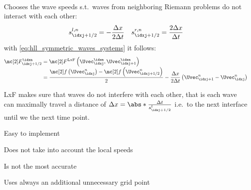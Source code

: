 \begin{defnbox}\nospacing
    \begin{defn}\label{defn:lax_friedrichs_scheme_non_linear_systems}\leavevmode\\
        Chooses the wave speeds s.t.\ waves from neighboring Riemann problems do not interact with each other:
        \begin{align}
          s_{\idxj+1/2}^{l,n}=-\frac{\Delta x}{2\Delta t}&&s_{\idxj+1/2}^{r,n}=\frac{2\Delta x}{\Delta t}
        \end{align}
        with \cref{eq:hll_symmetric_waves_systems} it follows:
        \begin{align}
          \Flux_{\idxj+1/2}^{\idxn}&=\Flux^{\text{LxF}}\left(\Uvec^{\idxn}_{\idxj},\Uvec^{\idxn}_{\idxj+1}\right)\\[-1\jot]
          &=\frac{\flux\left(\Uvec_{\idxj}^{n}\right)-\flux \left(\Uvec_{\idxj+1/2}^{n}\right)}{2}-\frac{\Delta x}{2\Delta t}\left(\Uvec_{\idxj+1}^{n}-\Uvec_{\idxj}^{n}\right)\nonumber
        \end{align}
    \end{defn}
\end{defnbox}
\begin{explanationbox}\nospacing
    \begin{explanation}
        LxF makes sure that waves do not interfere with each other, that is each wave can maximally travel a distance of $\Delta x=\abs*{\frac{\Delta t}{s_{\idxj+1/2}^{l}}}$ i.e.\ to the next interface until we the next time point.
    \end{explanation}
\end{explanationbox}
\begin{sectionbox}\nospacing
    \begin{minipage}[t]{0.4\textwidth}
       \begin{proslist}
           \item Easy to implement
       \end{proslist}
    \end{minipage}
    \begin{minipage}[t]{0.55\textwidth}
       \begin{conslist}
           \item Does not take into account the local speeds
           \item Is not the most accurate
           \item Uses always an additional unnecessary grid point
       \end{conslist}
    \end{minipage}
\end{sectionbox}
